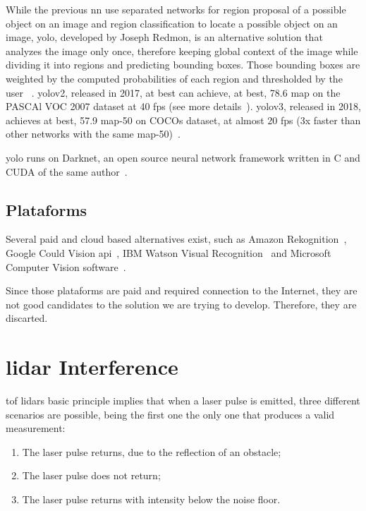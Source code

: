 While the previous \ac{nn} use separated networks for region proposal of a possible object on an image and region classification to locate a possible object on an image, \ac{yolo}, developed by Joseph Redmon, is an alternative solution that analyzes the image only once, therefore keeping global context of the image while dividing it into regions and predicting bounding boxes. Those bounding boxes are weighted by the computed probabilities of each region and thresholded by the user~\cite{Redmon2016} . \ac{yolo}v2, released in 2017, at best can achieve, at best, 78.6 \ac{map} on the PASCAl VOC 2007 dataset at 40 \ac{fps} (see more details~\cite{Redmon2017}). \ac{yolo}v3, released in 2018, achieves at best, 57.9 \ac{map}-50 on COCOs dataset, at almost 20 \ac{fps} (3x faster than other networks with the same \ac{map}-50)~\cite{Redmon2018}.

\ac{yolo} runs on Darknet, an open source neural network framework written in C and CUDA of the same author~\cite{Redmon2013}.


\subsection{Plataforms}
Several paid and cloud based alternatives exist, such as Amazon Rekognition~\cite{awsRecognition}, Google Could Vision \ac{api}~\cite{googlevision}, IBM Watson Visual Recognition~\cite{watson} and Microsoft Computer Vision software~\cite{azurecv}. 

Since those plataforms are paid and required connection to the Internet, they are not good candidates to the solution we are trying to develop. Therefore, they are discarted.


\section{\ac{lidar} Interference}
\ac{tof} \ac{lidar}s basic principle implies that when a \ac{laser} pulse is emitted, three different scenarios are possible, being the first one the only one that produces a valid measurement:

\begin{enumerate}
\item The \ac{laser} pulse returns, due to the reflection of an obstacle;
\item The \ac{laser} pulse does not return;
\item The \ac{laser} pulse returns with intensity below the noise floor.
\end{enumerate}

